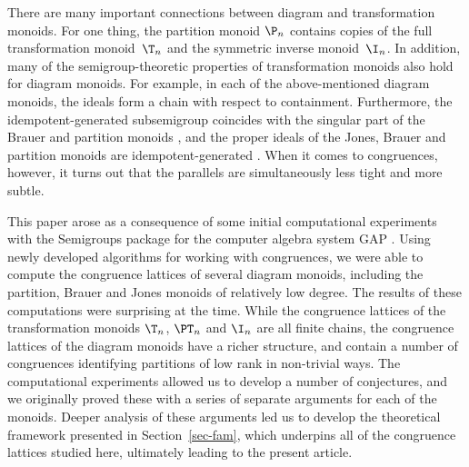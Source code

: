 There are many important connections between diagram and transformation
monoids.  For one thing, the partition monoid $\P_n$ contains copies of the
full transformation monoid~$\T_n$ and the symmetric inverse monoid~$\I_n$.  In
addition, many of the semigroup-theoretic properties of transformation monoids
also hold for diagram monoids.  For example, in each of the above-mentioned
diagram monoids, the ideals form a chain with respect to containment.
Furthermore, the idempotent-generated subsemigroup coincides with the singular
part of the Brauer and partition monoids \cite{JEpnsn,MM2007}, and the proper
ideals of the Jones, Brauer and partition monoids are idempotent-generated
\cite{EG2017}.
%
When it comes to congruences, however, it turns out that the parallels are
simultaneously less tight and more subtle.

This paper arose as a consequence
of some initial computational experiments with the Semigroups package
for the computer algebra system GAP \cite{GAP}.  Using newly developed
algorithms for working with congruences, we were able to compute the congruence
lattices of several diagram monoids, including the partition, Brauer and Jones
monoids of relatively low degree.  The results of these computations were
surprising at the time.  While the congruence lattices of the transformation
monoids $\T_n$, $\PT_n$ and $\I_n$ are all finite chains, the congruence
lattices of the diagram monoids have a richer structure, and contain a number
of congruences identifying partitions of low {rank} in non-trivial ways.
%
The computational experiments allowed us to develop a number of conjectures, and we originally proved these with a series of separate arguments for each of the monoids.  Deeper analysis of these arguments led us to develop the theoretical framework presented in Section~\ref{sec-fam}, which underpins all of the congruence lattices studied here, ultimately leading to the present article.

